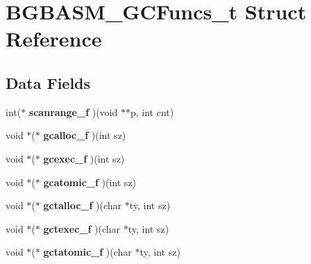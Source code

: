 \hypertarget{structBGBASM__GCFuncs__t}{\section{B\-G\-B\-A\-S\-M\-\_\-\-G\-C\-Funcs\-\_\-t Struct Reference}
\label{structBGBASM__GCFuncs__t}
}
\subsection*{Data Fields}
\begin{DoxyCompactItemize}
\item 
\hypertarget{structBGBASM__GCFuncs__t_afeead54da16bec56f5f98e273808090b}{int($\ast$ {\bfseries scanrange\-\_\-f} )(void $\ast$$\ast$p, int cnt)}\label{structBGBASM__GCFuncs__t_afeead54da16bec56f5f98e273808090b}

\item 
\hypertarget{structBGBASM__GCFuncs__t_a2f41f41989cdfb7fa837494d6893a916}{void $\ast$($\ast$ {\bfseries gcalloc\-\_\-f} )(int sz)}\label{structBGBASM__GCFuncs__t_a2f41f41989cdfb7fa837494d6893a916}

\item 
\hypertarget{structBGBASM__GCFuncs__t_a429e3958950971144f3aac3ef49ba54c}{void $\ast$($\ast$ {\bfseries gcexec\-\_\-f} )(int sz)}\label{structBGBASM__GCFuncs__t_a429e3958950971144f3aac3ef49ba54c}

\item 
\hypertarget{structBGBASM__GCFuncs__t_a8a227d823a01d5aeefc33b29081bfaf5}{void $\ast$($\ast$ {\bfseries gcatomic\-\_\-f} )(int sz)}\label{structBGBASM__GCFuncs__t_a8a227d823a01d5aeefc33b29081bfaf5}

\item 
\hypertarget{structBGBASM__GCFuncs__t_a2681969e4e6f474df93dbf3066e547d0}{void $\ast$($\ast$ {\bfseries gctalloc\-\_\-f} )(char $\ast$ty, int sz)}\label{structBGBASM__GCFuncs__t_a2681969e4e6f474df93dbf3066e547d0}

\item 
\hypertarget{structBGBASM__GCFuncs__t_a3ec2558fb78ef0b692d15b865e4fa1b0}{void $\ast$($\ast$ {\bfseries gctexec\-\_\-f} )(char $\ast$ty, int sz)}\label{structBGBASM__GCFuncs__t_a3ec2558fb78ef0b692d15b865e4fa1b0}

\item 
\hypertarget{structBGBASM__GCFuncs__t_af04521785608b4f458c7612b4aa1226a}{void $\ast$($\ast$ {\bfseries gctatomic\-\_\-f} )(char $\ast$ty, int sz)}\label{structBGBASM__GCFuncs__t_af04521785608b4f458c7612b4aa1226a}


\end{DoxyCompactItemize}
